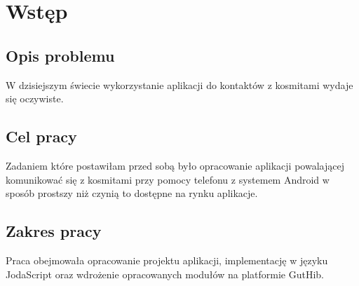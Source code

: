 
\chapter*{Wstęp}\label{ch:admission}

\section*{Opis problemu}\label{sec:problem-description}
W dzisiejszym świecie wykorzystanie aplikacji do kontaktów z kosmitami wydaje się oczywiste. \lipsum[6]
\par

\lipsum[5]
\section*{Cel pracy}\label{sec:thesis-goal}

Zadaniem które postawiłam przed sobą było opracowanie aplikacji powalającej komunikować się z kosmitami przy pomocy telefonu z systemem Android w sposób prostszy niż czynią to dostępne na rynku aplikacje. 

\section*{Zakres pracy}\label{sec:scope-of-work}

Praca obejmowała opracowanie projektu aplikacji, implementację w języku JodaScript oraz wdrożenie opracowanych modułów na platformie GutHib. \lipsum[14]

\thispagestyle{normal}